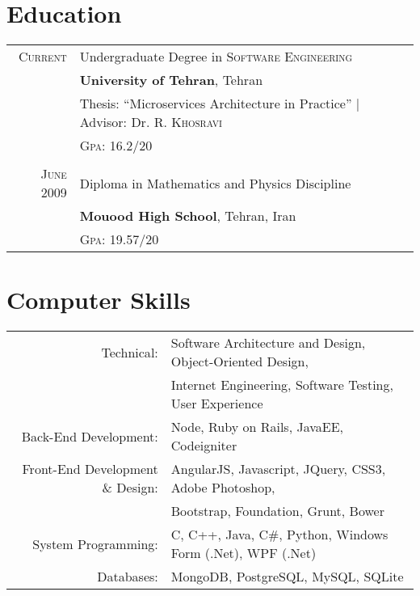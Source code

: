 \documentclass[a4paper,10pt]{article}
\begin{document}
\section{Education}
\begin{tabular}{rl}	

 \textsc{Current} & Undergraduate Degree in \textsc{Software Engineering} \\&\normalsize\textbf{University of Tehran}, Tehran\\
& Thesis: ``Microservices Architecture in Practice'' | \small Advisor: Dr. R. \textsc{Khosravi}\\
&\normalsize \textsc{Gpa}: 16.2/20\\&\\

\textsc{June} 2009& Diploma in Mathematics and Physics Discipline\\& \textbf{Mouood High School}, Tehran, Iran\\
&\textsc{Gpa}: 19.57/20
\end{tabular}

\section{Computer Skills}
\begin{tabular}{rl}
 Technical:& Software Architecture and Design, Object-Oriented Design,\\& Internet Engineering, Software Testing, User Experience\\
Back-End Development:& Node, Ruby on Rails, JavaEE, Codeigniter\\
Front-End Development \& Design:& AngularJS, Javascript, JQuery, CSS3, Adobe Photoshop, \\& Bootstrap, Foundation, Grunt, Bower\\
System Programming:& C, C++, Java, C\#, Python, Windows Form (.Net), WPF (.Net)\\
Databases:& MongoDB, PostgreSQL, MySQL, SQLite\\
\end{tabular}

\end{document}
